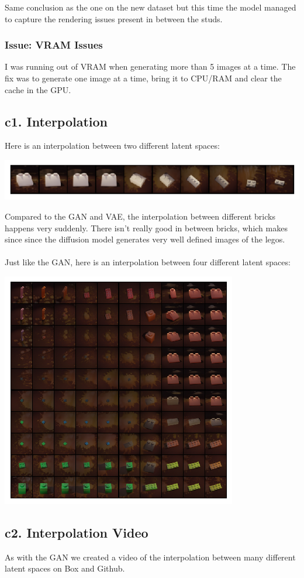 \documentclass[]{article}
\begin{document}
\noindent Same conclusion as the one on the new dataset but this time the model managed to capture the rendering issues present in between the studs.

\subsubsection*{Issue: VRAM Issues}
I was running out of VRAM when generating more than 5 images at a time. The fix was to
generate one image at a time, bring it to CPU/RAM and clear the cache in the GPU.
\newpage
\subsection*{c1. Interpolation}
Here is an interpolation between two different latent spaces:
\begin{center}
\includegraphics[scale=1.3]{./imgs/interp_diff}
\end{center}
Compared to the GAN and VAE, the interpolation between different bricks happens very suddenly.
There isn't really good in between bricks, which makes since since the diffusion model generates very well defined images of the legos. \\ \\
Just like the GAN, here is an interpolation between four different latent spaces:
\begin{center}
\includegraphics[scale=1.5]{imgs/diffusion_interp_between_4.png}
\end{center}
\newpage
\subsection*{c2. Interpolation Video}
As with the GAN we created a video of the interpolation between many different latent spaces on Box and Github.
\end{document}
